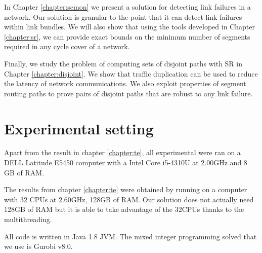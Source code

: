 In Chapter \ref{chapter:scmon} we present a solution for detecting link failures in a network. Our solution is granular to
the point that it can detect link failures within link bundles. We will also show that using the tools developed 
in Chapter \ref{chapter:sr}, we can provide exact bounds on the minimum number of segments required in any
cycle cover of a network.

Finally, we study the problem of computing sets of disjoint paths with SR in Chapter \ref{chapter:disjoint}. We show that
traffic duplication can be used to reduce the latency of network communications. We also exploit properties of
segment routing paths to prove pairs of disjoint paths that are robust to any link failure.


\section{Experimental setting}

Apart from the result in chapter \ref{chapter:te}, all experimental were ran on a DELL Latitude E5450 computer with a
Intel Core i5-4310U at 2.00GHz and 8 GB of RAM.

The results from chapter \ref{chapter:te} were obtained by running on a computer with 32 CPUs at 2.60GHz, 128GB of RAM.
Our solution does not actually need 128GB of RAM but it is able to take advantage of the 32CPUs thanks to the multithreading.

All code is written in Java 1.8 JVM. The mixed integer programming solved that we use is Gurobi v8.0.

